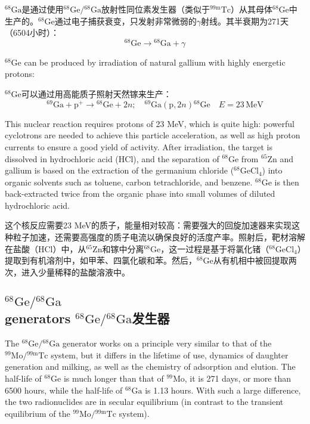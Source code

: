 \documentclass[dvipsnames, svgnames,a4paper,11pt]{article}
\begin{document}
\(\mathrm{^{68}Ga}\)是通过使用\(\mathrm{^{68}Ge}/\mathrm{^{68}Ga}\)放射性同位素发生器（类似于\(\mathrm{^{99m}Tc}\)）从其母体\(\mathrm{^{68}Ge}\)中生产的。\(\mathrm{^{68}Ge}\)通过电子捕获衰变，只发射非常微弱的$\gamma$射线。其半衰期为271天（6504小时）：  
\[
\mathrm{^{68}Ge} \rightarrow \mathrm{^{68}Ga} + \gamma
\]

\(\mathrm{^{68}Ge}\) can be produced by irradiation of natural gallium with highly energetic protons:  

\(\mathrm{^{68}Ge}\)可以通过用高能质子照射天然镓来生产：  
\[
\mathrm{^{69}Ga} + \mathrm{p}^{+} \rightarrow \mathrm{^{68}Ge} + 2n; \quad \mathrm{^{69}Ga}(\mathrm{p}, 2n)\mathrm{^{68}Ge} \quad E = 23 \, \mathrm{MeV}
\]

This nuclear reaction requires protons of 23 MeV, which is quite high: powerful cyclotrons are needed to achieve this particle acceleration, as well as high proton currents to ensure a good yield of activity. After irradiation, the target is dissolved in hydrochloric acid (HCl), and the separation of \(\mathrm{^{68}Ge}\) from \(\mathrm{^{65}Zn}\) and gallium is based on the extraction of the germanium chloride (\(\mathrm{^{68}GeCl_4}\)) into organic solvents such as toluene, carbon tetrachloride, and benzene. \(\mathrm{^{68}Ge}\) is then back-extracted twice from the organic phase into small volumes of diluted hydrochloric acid.

这个核反应需要23 MeV的质子，能量相对较高：需要强大的回旋加速器来实现这种粒子加速，还需要高强度的质子电流以确保良好的活度产率。照射后，靶材溶解在盐酸（HCl）中，从\(\mathrm{^{65}Zn}\)和镓中分离\(\mathrm{^{68}Ge}\)，这一过程是基于将氯化锗（\(\mathrm{^{68}GeCl_4}\)）提取到有机溶剂中，如甲苯、四氯化碳和苯。然后，\(\mathrm{^{68}Ge}\)从有机相中被回提取两次，进入少量稀释的盐酸溶液中。

\subsection{\(\mathrm{^{68}Ge}/\mathrm{^{68}Ga}\)\\ generators \(\mathrm{^{68}Ge}/\mathrm{^{68}Ga}\)发生器}  
The \(\mathrm{^{68}Ge}/\mathrm{^{68}Ga}\) generator works on a principle very similar to that of the \(\mathrm{^{99}Mo}/\mathrm{^{99m}Tc}\) system, but it differs in the lifetime of use, dynamics of daughter generation and milking, as well as the chemistry of adsorption and elution. The half-life of \(\mathrm{^{68}Ge}\) is much longer than that of \(\mathrm{^{99}Mo}\), it is 271 days, or more than 6500 hours, while the half-life of \(\mathrm{^{68}Ga}\) is 1.13 hours. With such a large difference, the two radionuclides are in secular equilibrium (in contrast to the transient equilibrium of the \(\mathrm{^{99}Mo}/\mathrm{^{99m}Tc}\) system).  
\end{document}
